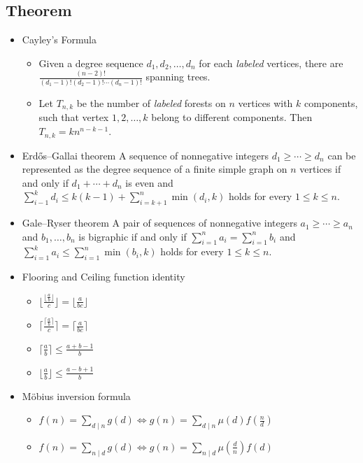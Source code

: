 \documentclass[10pt, a4paper, twocolumn, oneside]{article}
\begin{document}
\subsection{Theorem}
\begin{itemize}
\item Cayley's Formula
\begin{itemize}
    \itemsep-0.5em
  \item Given a degree sequence $d_1, d_2, \ldots, d_n$ for each \textit{labeled} vertices, there are $\frac{(n - 2)!}{(d_1 - 1)!(d_2 - 1)!\cdots(d_n - 1)!}$ spanning trees.
  \item Let $T_{n, k}$ be the number of \textit{labeled} forests on $n$ vertices with $k$ components, such that vertex $1, 2, \ldots, k$ belong to different components. Then $T_{n, k} = kn^{n - k - 1}$.
\end{itemize}
\item Erdős–Gallai theorem 
A sequence of nonnegative integers $d_1\ge\cdots\ge d_n$ can be represented as the degree sequence of a finite simple graph on $n$ vertices if and only if $d_1+\cdots+d_n$ is even and $\displaystyle\sum_{i-1}^kd_i\le k(k-1)+\displaystyle\sum_{i=k+1}^n\min(d_i,k)$ holds for every $1\le k\le n$.
\item Gale–Ryser theorem
A pair of sequences of nonnegative integers $a_1\ge\cdots\ge a_n$ and $b_1,\ldots,b_n$ is bigraphic if and only if $\displaystyle\sum_{i=1}^n a_i=\displaystyle\sum_{i=1}^n b_i$ and $\displaystyle\sum_{i=1}^k a_i\le \displaystyle\sum_{i=1}^n\min(b_i,k)$ holds for every $1\le k\le n$.
\item Flooring and Ceiling function identity
\begin{itemize} 
    \itemsep-0.1em
  \item $\lfloor \frac{\lfloor \frac{a}{b} \rfloor}{c} \rfloor = \lfloor \frac{a}{bc} \rfloor$
  \item $\lceil \frac{\lceil \frac{a}{b} \rceil}{c} \rceil = \lceil \frac{a}{bc} \rceil$
  \item $\lceil \frac{a}{b} \rceil \leq \frac{a+b-1}{b}$
  \item $\lfloor \frac{a}{b} \rfloor \leq \frac{a-b+1}{b}$ 
\end{itemize}
\item Möbius inversion formula
\begin{itemize}
    \itemsep-0.5em
  \item $f(n)=\sum_{d\mid n}g(d)\Leftrightarrow g(n)=\sum_{d\mid n}\mu(d)f(\frac{n}{d})$
  \item $f(n)=\sum_{n\mid d}g(d)\Leftrightarrow g(n)=\sum_{n\mid d}\mu(\frac{d}{n})f(d)$

\end{itemize}
\end{itemize}
\end{document}
